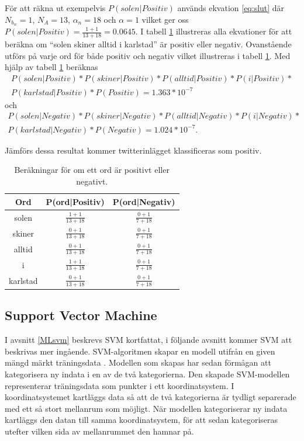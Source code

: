 \documentclass{kaumasters} %
\begin{document}
För att räkna ut exempelvis $P(solen|Positiv)$ används ekvation \ref{eq:slut} där $N_{b_w} = 1$, $N_A= 13$, $\alpha_n = 18$ och $\alpha = 1$ vilket ger oss $P(solen|Positiv) =  \frac{1 + 1}{13 + 18} = 0.0645$. I tabell \ref{tab:ekv} illustreras alla ekvationer för att beräkna om “solen skiner alltid i karlstad” är positiv eller negativ. Ovanstående utförs på varje ord för både positiv och negativ vilket illustreras i tabell \ref{tab:ekv}.  Med hjälp av tabell \ref{tab:ekv} beräknas 
\begin{multline*}
P(solen|Positiv) * P(skiner|Positiv) * P(alltid|Positiv) * P(i|Positiv) *  \\P(karlstad|Positiv) * P(Positiv) = 1.363 * 10^{-7}
\end{multline*}
och
\begin{multline*}
P(solen|Negativ) * P(skiner|Negativ) * P(alltid|Negativ) * P(i|Negativ) *  \\P(karlstad|Negativ) * P(Negativ) = 1.024 * 10^{-7}.
\end{multline*}

Jämförs dessa resultat kommer twitterinlägget klassificeras som positiv. 


\begin{table}
\centering
\caption{Beräkningar för om ett ord är positivt eller negativt.}
\label{tab:ekv}
    \begin{tabular}{ccc}
    \toprule
    \textbf{Ord} & \textbf{P(ord|Positiv)} & \textbf{P(ord|Negativ)} \\
    \midrule
    solen & $\frac{1 + 1}{13 + 18} $ & $\frac{0 + 1}{7 + 18} $\\
    skiner & $\frac{0 + 1}{13 + 18} $ & $\frac{0 + 1}{7 + 18}$ \\
    alltid & $\frac{0 + 1}{13 + 18}$ & $\frac{0 + 1}{7 + 18}$ \\
    i & $\frac{1 + 1}{13 + 18} $& $\frac{0 + 1}{7 + 18}$ \\
karlstad & $\frac{0 + 1}{13 + 18}$ & $\frac{0 + 1}{7 + 18}$ \\
    \bottomrule
\end{tabular}
\end{table}


\subsection{Support Vector Machine}
I avsnitt \ref{MLsvm} beskrevs SVM kortfattat, i följande avsnitt kommer SVM att beskrivas mer ingående. SVM-algoritmen skapar en modell utifrån en given mängd märkt träningsdata \cite{svm:002}. Modellen som skapas har sedan förmågan att kategorisera ny indata i en av de två kategorierna. Den skapade SVM-modellen representerar träningsdata som punkter i ett koordinatsystem. I koordinatsystemet kartläggs data så att de två kategorierna är tydligt separerade med ett så stort mellanrum som möjligt. När modellen kategoriserar ny indata kartläggs den datan till samma koordinatsystem, för att sedan kategoriseras utefter vilken sida av mellanrummet den hamnar på.  
\end{document}
